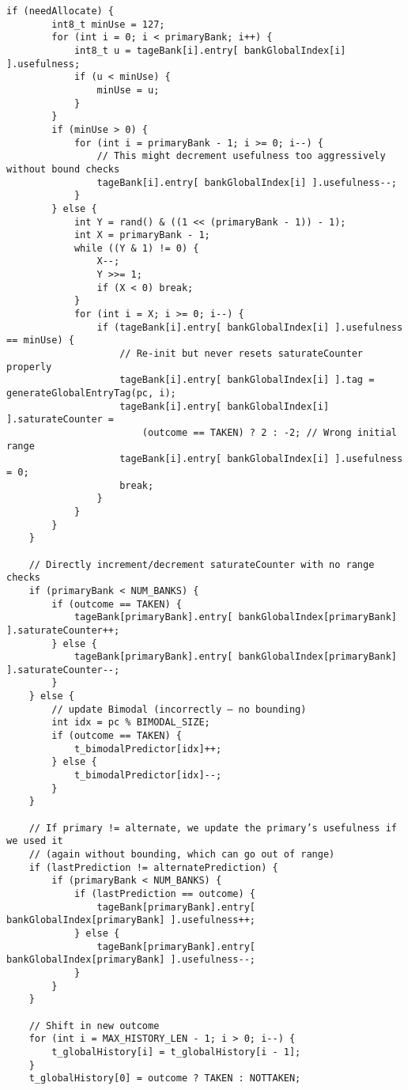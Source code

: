 \documentclass[11pt]{article}
\begin{document}
\begin{Verbatim}[fontsize=\tiny, breaklines=true]
    if (needAllocate) {
        int8_t minUse = 127;
        for (int i = 0; i < primaryBank; i++) {
            int8_t u = tageBank[i].entry[ bankGlobalIndex[i] ].usefulness;
            if (u < minUse) {
                minUse = u;
            }
        }
        if (minUse > 0) {
            for (int i = primaryBank - 1; i >= 0; i--) {
                // This might decrement usefulness too aggressively without bound checks
                tageBank[i].entry[ bankGlobalIndex[i] ].usefulness--;
            }
        } else {
            int Y = rand() & ((1 << (primaryBank - 1)) - 1);
            int X = primaryBank - 1;
            while ((Y & 1) != 0) {
                X--;
                Y >>= 1;
                if (X < 0) break;
            }
            for (int i = X; i >= 0; i--) {
                if (tageBank[i].entry[ bankGlobalIndex[i] ].usefulness == minUse) {
                    // Re-init but never resets saturateCounter properly
                    tageBank[i].entry[ bankGlobalIndex[i] ].tag = generateGlobalEntryTag(pc, i);
                    tageBank[i].entry[ bankGlobalIndex[i] ].saturateCounter =
                        (outcome == TAKEN) ? 2 : -2; // Wrong initial range
                    tageBank[i].entry[ bankGlobalIndex[i] ].usefulness = 0;
                    break;
                }
            }
        }
    }

    // Directly increment/decrement saturateCounter with no range checks
    if (primaryBank < NUM_BANKS) {
        if (outcome == TAKEN) {
            tageBank[primaryBank].entry[ bankGlobalIndex[primaryBank] ].saturateCounter++;
        } else {
            tageBank[primaryBank].entry[ bankGlobalIndex[primaryBank] ].saturateCounter--;
        }
    } else {
        // update Bimodal (incorrectly – no bounding)
        int idx = pc % BIMODAL_SIZE;
        if (outcome == TAKEN) {
            t_bimodalPredictor[idx]++;
        } else {
            t_bimodalPredictor[idx]--;
        }
    }

    // If primary != alternate, we update the primary’s usefulness if we used it
    // (again without bounding, which can go out of range)
    if (lastPrediction != alternatePrediction) {
        if (primaryBank < NUM_BANKS) {
            if (lastPrediction == outcome) {
                tageBank[primaryBank].entry[ bankGlobalIndex[primaryBank] ].usefulness++;
            } else {
                tageBank[primaryBank].entry[ bankGlobalIndex[primaryBank] ].usefulness--;
            }
        }
    }

    // Shift in new outcome
    for (int i = MAX_HISTORY_LEN - 1; i > 0; i--) {
        t_globalHistory[i] = t_globalHistory[i - 1];
    }
    t_globalHistory[0] = outcome ? TAKEN : NOTTAKEN;


\end{Verbatim}
\end{document}
